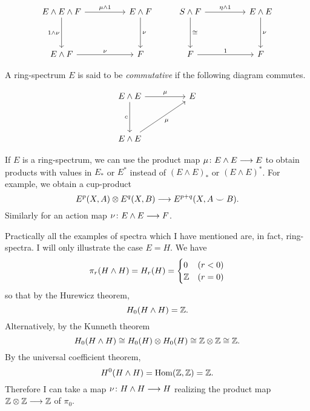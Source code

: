\documentclass[../main]{subfiles}
\begin{document}
\[
\begin{tikzcd}
E \wedge E \wedge F \arrow[dd, "1 \wedge \nu"'] \arrow[rr, "\mu \wedge 1"] &  & E \wedge F \arrow[dd, "\nu"] & S \wedge F \arrow[rr, "\eta \wedge 1"] \arrow[dd, "\cong"] &  & E \wedge E \arrow[dd, "\nu"] \\
                                                                           &  &                              &                                                   &  &                              \\
E \wedge F \arrow[rr, "\nu"]                                               &  & F                            & F \arrow[rr, "1"]                                 &  & F                           
\end{tikzcd}
\]


A ring-spectrum $E$ is said to be \emph{commutative}  if the following diagram commutes.



\[
\begin{tikzcd}
E \wedge E \arrow[rr, "\mu"] \arrow[dd, "c"'] &  & E \\
                                              &  &   \\
E \wedge E \arrow[rruu, "\mu"']               &  &  
\end{tikzcd}
\]


If $E$ is a ring-spectrum, we can use the product map $\mu \colon E \wedge E \longrightarrow E$ to obtain products with values in $E_*$ or $E^*$ instead of $(E \wedge E)_*$ or $(E \wedge E)^*$. For example, we obtain a cup-product 
\[E^p(X,A) \otimes E^q(X,B) \longrightarrow E^{p+q}(X,A \smile B).\]
Similarly for an action map $\nu \colon E \wedge E \longrightarrow F$.

Practically all the examples of spectra which I have mentioned are, in fact, ring-spectra. I will only illustrate the case $E=H$. We have
\[\pi_r (H \wedge H) = H_r(H) = \begin{cases}
    0 & (r < 0) \\
    \mathbb{Z} & (r=0)
\end{cases}\]
so that by the Hurewicz theorem,
\[H_0(H \wedge H) = \mathbb{Z}.\]
Alternatively, by the Kunneth theorem
\[H_0(H \wedge H) \cong H_0(H) \otimes H_0(H) \cong \mathbb{Z} \otimes \mathbb{Z} \cong \mathbb{Z}.\]
By the universal coefficient theorem,
\[H^0(H \wedge H) = \mathrm{Hom}(\mathbb{Z},\mathbb{Z}) = \mathbb{Z}.\]
Therefore I can take a map $\nu \colon H \wedge H \longrightarrow H$ realizing the product map $\mathbb{Z} \otimes \mathbb{Z} \longrightarrow \mathbb{Z}$ of $\pi_0$.
\end{document}
